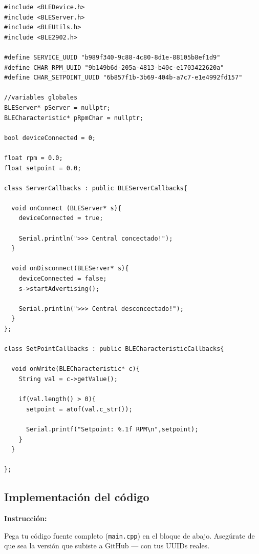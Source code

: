 \documentclass[12pt, letterpaper]{article}
\newenvironment{instruccion}{%
  \begin{mdframed}[
    backgroundcolor = tealLight,
    linecolor       = tealMain,
    linewidth       = 1pt,
    innerleftmargin = 10pt, innerrightmargin = 10pt,
    innertopmargin  = 6pt,  innerbottommargin= 6pt
  ]
  \small\color{tealMain}\textbf{Instrucción:}\hspace{4pt}\color{black}
}{%
  \end{mdframed}
}
\begin{document}
\begin{lstlisting}[caption={platformio.ini — tu configuración real}, label={lst:platformio}]
#include <BLEDevice.h>
#include <BLEServer.h>
#include <BLEUtils.h>
#include <BLE2902.h>

#define SERVICE_UUID "b989f340-9c88-4c80-8d1e-88105b8ef1d9"
#define CHAR_RPM_UUID "9b149b6d-205a-4813-b40c-e1703422620a"
#define CHAR_SETPOINT_UUID "6b857f1b-3b69-404b-a7c7-e1e4992fd157"

//variables globales
BLEServer* pServer = nullptr;
BLECharacteristic* pRpmChar = nullptr;

bool deviceConnected = 0;

float rpm = 0.0;
float setpoint = 0.0;

class ServerCallbacks : public BLEServerCallbacks{

  void onConnect (BLEServer* s){
    deviceConnected = true;

    Serial.println(">>> Central concectado!");
  }

  void onDisconnect(BLEServer* s){
    deviceConnected = false;
    s->startAdvertising();

    Serial.println(">>> Central desconcectado!");
  }
};

class SetPointCallbacks : public BLECharacteristicCallbacks{

  void onWrite(BLECharacteristic* c){
    String val = c->getValue();

    if(val.length() > 0){
      setpoint = atof(val.c_str());

      Serial.printf("Setpoint: %.1f RPM\n",setpoint);
    }
  }

};
\end{lstlisting}

\subsection{Implementación del código}

\begin{instruccion}
  Pega tu código fuente completo (\texttt{main.cpp}) en el bloque de abajo.
  Asegúrate de que sea la versión que subiste a GitHub — con tus UUIDs reales.
\end{instruccion}
\end{document}
